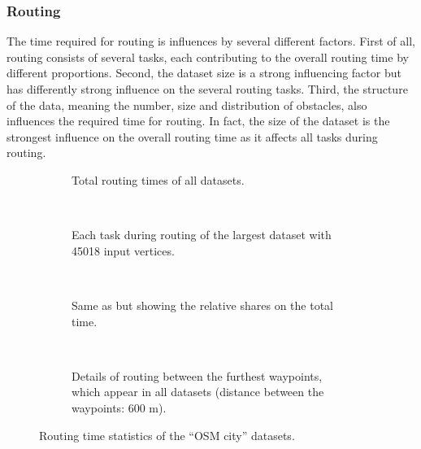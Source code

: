 		\subsubsection{Routing}
		
			The time required for routing is influences by several different factors.
			First of all, routing consists of several tasks, each contributing to the overall routing time by different proportions.
			Second, the dataset size is a strong influencing factor but has differently strong influence on the several routing tasks.
			Third, the structure of the data, meaning the number, size and distribution of obstacles, also influences the required time for routing.
			In fact, the size of the dataset is the strongest influence on the overall routing time as it affects all tasks during routing.
		
			\begin{figure}[h]
				\begin{figcenter}
					\begin{subfigure}[t]{\textwidth}
						\begin{figcenter}
							
						\end{figcenter}
						\caption{Total routing times of all datasets.}
					\end{subfigure}
					\\[3ex]
					\begin{subfigure}[t]{\textwidth}
						\begin{figcenter}
							
						\end{figcenter}
						\caption{Each task during routing of the largest dataset with 45018 input vertices.}
						\label{fig:eval-city-routing-details-b}
					\end{subfigure}
					\\[3ex]
					\begin{subfigure}[t]{\textwidth}
						\begin{figcenter}
							
						\end{figcenter}
						\caption{Same as  but showing the relative shares on the total time.}
					\end{subfigure}
					\\[3ex]
					\begin{subfigure}[t]{\textwidth}
						\begin{figcenter}
							
						\end{figcenter}
						\caption{Details of routing between the furthest waypoints, which appear in all datasets (distance between the waypoints: 600 m).}
					\end{subfigure}
				\end{figcenter}
				\caption{Routing time statistics of the \enquote{OSM city} datasets.}
			\end{figure}
			
